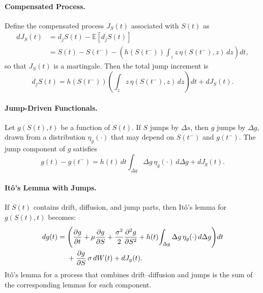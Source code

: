 \documentclass[10pt,twocolumn]{article}
\begin{document}
\paragraph{Compensated Process.}
Define the compensated process $J_S(t)$ associated with $S(t)$ as
\begin{align}
dJ_S(t)
&= d_j S(t) - \mathbb{E}[d_j S(t)] \\
&= S(t) - S(t^-)
- \left(h(S(t^-)) \int_z z\,\eta(S(t^-),z)\,dz \right)\!dt,
\end{align}
so that $J_S(t)$ is a martingale.  
Then the total jump increment is
\begin{equation}
d_j S(t)
= h(S(t^-))\!\left(\int_z z\,\eta(S(t^-),z)\,dz\right)dt
+ dJ_S(t).
\end{equation}

\paragraph{Jump-Driven Functionals.}
Let $g(S(t), t)$ be a function of $S(t)$.
If $S$ jumps by $\Delta s$, then $g$ jumps by $\Delta g$, drawn from a distribution $\eta_g(\cdot)$ that may depend on $S(t^-)$ and $g(t^-)$.  
The jump component of $g$ satisfies
\begin{equation}
g(t) - g(t^-)
= h(t)\,dt \int_{\Delta g} \Delta g\,\eta_g(\cdot)\,d\Delta g
+ dJ_g(t).
\end{equation}

\paragraph{It\^o’s Lemma with Jumps.}
If $S(t)$ contains drift, diffusion, and jump parts, then It\^o’s lemma for $g(S(t), t)$ becomes:
\begin{align}
dg(t)
={}&
\Bigg(
\frac{\partial g}{\partial t}
+ \mu \frac{\partial g}{\partial S}
+ \frac{\sigma^2}{2} \frac{\partial^2 g}{\partial S^2}
+ h(t)\!\int_{\Delta g} \Delta g\,\eta_g(\cdot)\,d\Delta g
\Bigg) dt \notag\\
&+ \frac{\partial g}{\partial S}\,\sigma\,dW(t)
+ dJ_g(t).
\end{align}
It\^o’s lemma for a process that combines drift–diffusion and jumps is the sum of the corresponding lemmas for each component.

\clearpage
\FloatBarrier
\small


\end{document}
